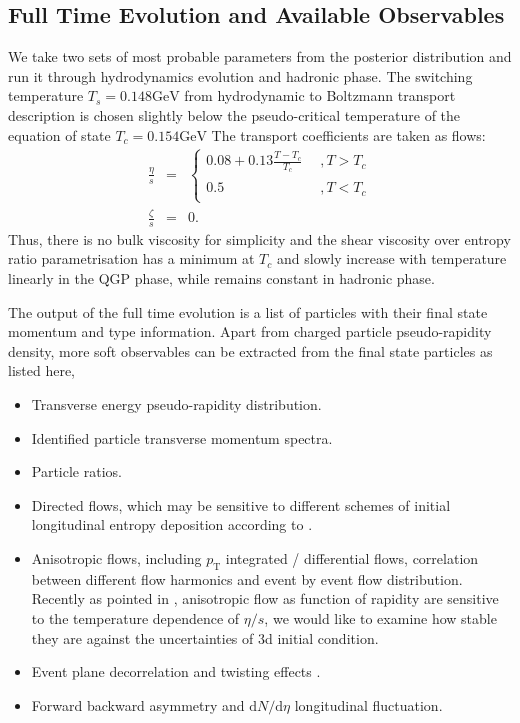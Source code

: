 \documentclass[aps,prl,twocolumn,groupedaddress]{revtex4-1}
\begin{document}
	\subsection{Full Time Evolution and Available Observables}
	We take two sets of most probable parameters from the  posterior distribution and run it through hydrodynamics evolution and hadronic phase. 
	The switching temperature $T_s = 0.148 \textrm{GeV}$ from hydrodynamic to Boltzmann transport description is chosen slightly below the pseudo-critical temperature of the equation of state $T_c = 0.154 \textrm{GeV}$ The transport coefficients are taken as flows:
	\begin{eqnarray}
		\frac{\eta}{s}  & = & 
		\left\{ \begin{array}{l}
		0.08 + 0.13 \frac{T - T_c}{T_c} \phantom{0.5} , T > T_c \\
		0.5 \phantom{0.08 + 0.13 \frac{T - T_c}{T_c}}, T < T_c
		\end{array}
		\right.	\\
		\frac{\zeta}{s} &=&  0.
	\end{eqnarray}
	Thus, there is no bulk viscosity for simplicity and the shear viscosity over entropy ratio parametrisation has a minimum at $T_c$ and slowly increase with temperature linearly in the QGP phase, while remains constant in hadronic phase.
		
	The output of the full time evolution is a list of particles with their final state momentum and type information.
	Apart from charged particle pseudo-rapidity density, more soft observables can be extracted from the final state particles as listed here,
	\begin{itemize}
	\item Transverse energy pseudo-rapidity distribution.
	\item Identified particle transverse momentum spectra.
	\item Particle ratios.
	\item Directed flows, which may be sensitive to different schemes of initial longitudinal entropy deposition according to \citep{Pitor:2009IC3d-1}.
	\item Anisotropic flows, including $p_\textrm{T}$ integrated / differential flows, correlation between different flow harmonics and event by event flow distribution. Recently as pointed in \citep{Denicol:2015vn-eta}, anisotropic flow as function of rapidity are sensitive to the temperature dependence of $\eta/s$, we would like to examine how stable they are against the uncertainties of 3d initial condition.
	\item Event plane decorrelation and twisting effects \citep{CMS:2015EP-decorr}.
	\item Forward backward asymmetry and $\mathrm{d}N /\mathrm{d}\eta$ longitudinal fluctuation.
	\end{itemize}
	
\end{document}
